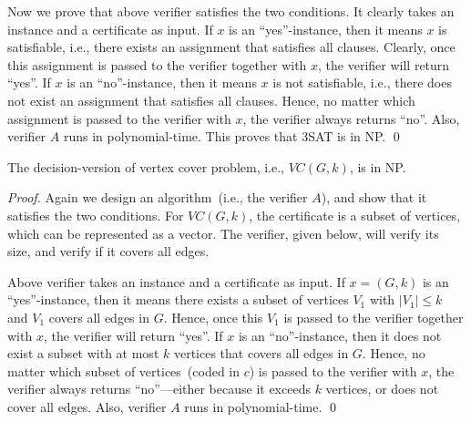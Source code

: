 Now we prove that above verifier satisfies the two conditions.
It clearly takes an instance and a certificate as input.
If $x$ is an ``yes''-instance, then it means $x$ is satisfiable, i.e.,
there exists an assignment that satisfies all clauses.
Clearly, once this assignment is passed to the verifier together with $x$,
the verifier will return ``yes''.
If $x$ is an ``no''-instance, then it means $x$ is not satisfiable, i.e.,
there does not exist an assignment that satisfies all clauses.
Hence, no matter which assignment is passed to the verifier with $x$,
the verifier always returns ``no''. Also, verifier $A$ runs in polynomial-time.
This proves that 3SAT is in NP.
\qed


\begin{fact}
The decision-version of vertex cover problem, i.e., $VC(G, k)$, is in NP.
\end{fact}

\emph{Proof.} Again we design an algorithm~(i.e., the verifier $A$), and show that it satisfies the two
conditions. For $VC(G, k)$, the certificate is a subset of vertices, which
can be represented as a vector.
The verifier, given below, will verify its size, and verify if it covers all edges.

\begin{minipage}{0.8\textwidth}
	\xxx
	\xxx
	\xxx
	\xxx
	\xxx
\end{minipage}

Above verifier takes an instance and a certificate as input.
If $x = (G, k)$ is an ``yes''-instance, then it means there exists a subset of vertices $V_1$
with $|V_1| \le k$ and $V_1$ covers all edges in $G$.
Hence, once this $V_1$ is passed to the verifier together with $x$,
the verifier will return ``yes''.
If $x$ is an ``no''-instance, then it does not exist a subset with at most $k$ vertices
that covers all edges in $G$.
Hence, no matter which subset of vertices~(coded in $c$) is passed to the verifier with $x$,
the verifier always returns ``no''---either because it exceeds $k$ vertices,
or does not cover all edges.  Also, verifier $A$ runs in polynomial-time.
\qed


